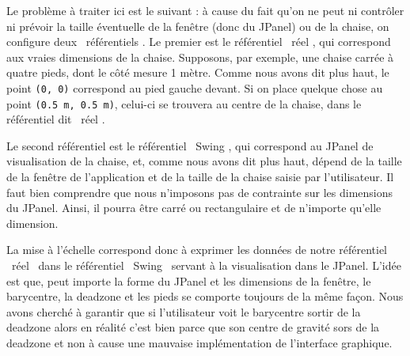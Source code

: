 \documentclass{polytech/polytech}
\begin{document}
Le problème à traiter ici est le suivant : à cause du fait qu'on ne peut ni contrôler ni prévoir la taille éventuelle de la fenêtre (donc du JPanel) ou de la chaise, on configure deux \guillemotleft\ référentiels \guillemotright . 
Le premier est le référentiel \guillemotleft\ réel \guillemotright , qui correspond aux vraies dimensions de la chaise.
Supposons, par exemple, une chaise carrée à quatre pieds, dont le côté mesure 1 mètre.
Comme nous avons dit plus haut, le point \texttt{(0, 0)} correspond au pied gauche devant.
Si on place quelque chose au point \texttt{(0.5 m, 0.5 m)}, celui-ci se trouvera au centre de la chaise, dans le référentiel dit \guillemotleft\ réel \guillemotright . 

Le second référentiel est le référentiel \guillemotleft\ Swing \guillemotright , qui correspond au JPanel de visualisation de la chaise, et, comme nous avons dit plus haut, dépend de la taille de la fenêtre de l'application et de la taille de la chaise saisie par l'utilisateur. 
Il faut bien comprendre que nous n'imposons pas de contrainte sur les dimensions du JPanel. Ainsi, il pourra être carré ou rectangulaire et de n'importe qu'elle dimension.


La mise à l'échelle correspond donc à exprimer les données de notre référentiel \guillemotleft\ réel \guillemotright\ dans le référentiel \guillemotleft\ Swing \guillemotright\  servant à la visualisation dans le JPanel. 
L'idée est que, peut importe la forme du JPanel et les dimensions de la fenêtre, le barycentre, la deadzone et les pieds se comporte toujours de la même façon.
 Nous avons cherché à garantir que si l'utilisateur voit le barycentre sortir de la deadzone alors en réalité c'est bien parce que son centre de gravité sors de la deadzone et non à cause une mauvaise implémentation de l'interface graphique.
 
\end{document}
